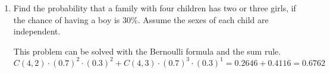 \documentclass[12pt]{article}
\newenvironment{answer}{\larger[2]}{}
\begin{document}
\begin{enumerate}
\begin{enumerate}[itemsep=\fill,after=\vfill]
\end{enumerate} %



\item Find the probability that a family with four children has two or three
girls, if the chance of having a boy is 30\%. Assume the sexes of each child are
independent.

\begin{answer}
This problem can be solved with the Bernoulli formula and the sum rule. $C(4, 2)
\cdot (0.7)^2 \cdot (0.3)^2 + C(4,3) \cdot (0.7)^3 \cdot (0.3)^1 = 0.2646 +
0.4116 = 0.6762$
\end{answer}

\vfill

\end{enumerate} %
\end{document}
